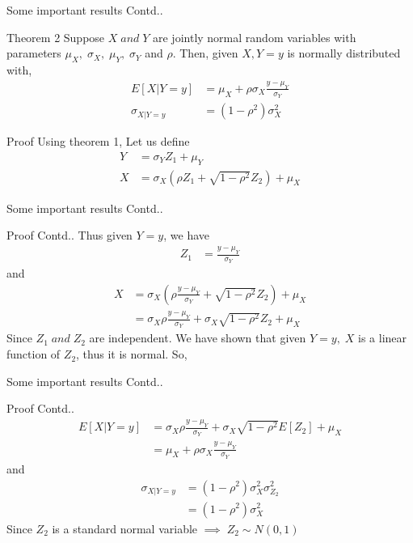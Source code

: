\documentclass{beamer}
\providecommand{\brak}[1]{\ensuremath{\left(#1\right)}}
\begin{document}
\begin{frame}{Some important results Contd..}
    \begin{block}{Theorem 2}
    Suppose $X\; and\; Y$ are jointly normal random variables with parameters $\mu_X,\;\sigma_X,\;\mu_Y,\;\sigma_Y$ and $\rho$.
    Then, given $X,Y=y$ is normally distributed with,
    \begin{align}
        E[X|Y=y]&=\mu_X+\rho\sigma_X\frac{y-\mu_Y}{\sigma_Y}\label{T1}\\
        \sigma_{{X|Y=y}}&=\brak{1-\rho^2}\sigma_X^2\label{T2}
    \end{align}
    \end{block}
    \begin{block}{Proof}
    Using theorem 1, Let us define
    \begin{align}
        Y&=\sigma_Y Z_1 +\mu_Y\\
        X&=\sigma_X\brak{\rho Z_1+\sqrt{1-\rho^2}Z_2}+\mu_X
    \end{align}
    \end{block}
\end{frame}

\begin{frame}{Some important results Contd..}
    \begin{block}{Proof Contd..}
    Thus given $Y=y$, we have
    \begin{align}
         Z_1&=\frac{y-\mu_Y}{\sigma_Y}
    \end{align}
    and
    \begin{align}
        X&=\sigma_X\brak{\rho \frac{y-\mu_Y}{\sigma_Y}+\sqrt{1-\rho^2}Z_2}+\mu_X\\
        &= \sigma_X\rho \frac{y-\mu_Y}{\sigma_Y}+\sigma_X\sqrt{1-\rho^2}Z_2+\mu_X
    \end{align}
    Since $Z_1\;and\;Z_2$ are independent.  We have shown that given $Y=y,\;X$ is a linear function of $Z_2$, thus it is normal. So,
    \end{block}
\end{frame}
\begin{frame}{Some important results Contd..}
    \begin{block}{Proof Contd..}
    \begin{align}
        E[X|Y=y]&=\sigma_X\rho \frac{y-\mu_Y}{\sigma_Y}+\sigma_X\sqrt{1-\rho^2}E[Z_2]+\mu_X\\
        &=\mu_X+\rho\sigma_X\frac{y-\mu_Y}{\sigma_Y}
    \end{align}
    and
    \begin{align}
        \sigma_{{X|Y=y}}&=\brak{1-\rho^2}\sigma_X^2\sigma_{Z_2}^2\\
        &=\brak{1-\rho^2}\sigma_X^2
    \end{align}
    Since $Z_2$ is a standard normal variable $\implies\;Z_2\sim N(0,1)$ 
    \end{block}
\end{frame}
\end{document}

